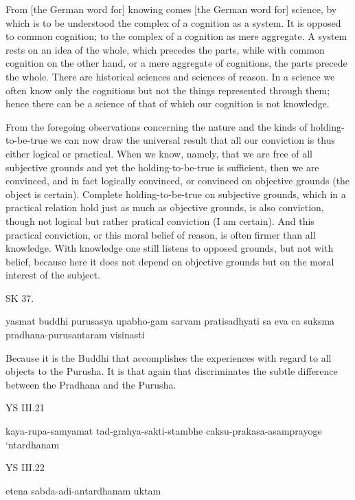     From [the German word for] knowing comes [the German word for] science,
    by which is to be understood the complex of a cognition as a system.
    It is opposed to common cognition;
    to the complex of a cognition as mere aggregate.
    A system rests on an idea of the whole, which precedes the parts,
    while with common cognition on the other hand,
    or a mere aggregate of cognitions, the parts precede the whole.
    There are historical sciences and sciences of reason.
    In a science we often know only the cognitions but
    not the things represented through them;
    hence there can be a science of that of which
    our cognition is not knowledge.

    From the foregoing observations concerning
    the nature and the kinds of holding-to-be-true
    we can now draw the universal result that
    all our conviction is thus either logical or practical.
    When we know, namely, that we are free of all subjective grounds and
    yet the holding-to-be-true is sufficient,
    then we are convinced, and in fact logically convinced, or
    convinced on objective grounds (the object is certain).
    Complete holding-to-be-true on subjective grounds,
    which in a practical relation hold just as much as objective grounds,
    is also conviction, though not logical but rather pratical conviction (I am certain).
    And this practical conviction, or this moral belief of reason,
    is often firmer than all knowledge.
    With knowledge one still listens to opposed grounds,
    but not with belief, because here it does not depend
    on objective grounds but on the moral interest of the subject.

SK 37.

yasmat buddhi purusasya upabho-gam sarvam pratisadhyati
sa eva ca suksma pradhana-purusantaram visinasti

Because it is the Buddhi that accomplishes the experiences
with regard to all objects to the Purusha.
It is that again that discriminates the subtle difference
between the Pradhana and the Purusha.

YS III.21

    kaya-rupa-samyamat tad-grahya-sakti-stambhe caksu-prakasa-asamprayoge ‘ntardhanam

YS III.22

    etena sabda-adi-antardhanam uktam

